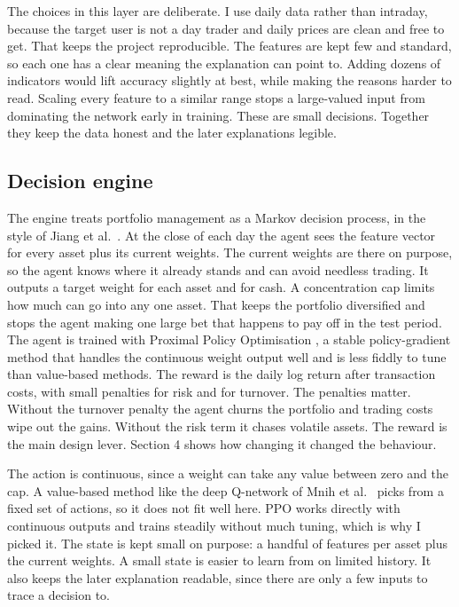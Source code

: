 \documentclass[12pt,twoside,letterpaper]{article}
\begin{document}
The choices in this layer are deliberate. I use daily data rather than intraday,
because the target user is not a day trader and daily prices are clean and free to
get. That keeps the project reproducible. The features are kept few and standard, so
each one has a clear meaning the explanation can point to. Adding dozens of
indicators would lift accuracy slightly at best, while making the reasons harder to
read. Scaling every feature to a similar range stops a large-valued input from
dominating the network early in training. These are small decisions. Together they
keep the data honest and the later explanations legible.

\subsection{Decision engine}

The engine treats portfolio management as a Markov decision process, in the style of
Jiang et al.\ \cite{jiang2017}. At the close of each day the agent sees the feature
vector for every asset plus its current weights. The current weights are there on
purpose, so the agent knows where it already stands and can avoid needless trading.
It outputs a target weight for each asset and for cash. A concentration cap limits
how much can go into any one asset. That keeps the portfolio diversified and stops
the agent making one large bet that happens to pay off in the test period. The agent
is trained with Proximal Policy Optimisation \cite{schulman2017}, a stable
policy-gradient method that handles the continuous weight output well and is less
fiddly to tune than value-based methods. The reward is the daily log return after
transaction costs, with small penalties for risk and for turnover. The penalties
matter. Without the turnover penalty the agent churns the portfolio and trading
costs wipe out the gains. Without the risk term it chases volatile assets. The
reward is the main design lever. Section 4 shows how changing it changed the
behaviour.

The action is continuous, since a weight can take any value between zero and the
cap. A value-based method like the deep Q-network of Mnih et al.\ \cite{mnih2015}
picks from a fixed set of actions, so it does not fit well here. PPO works directly
with continuous outputs and trains steadily without much tuning, which is why I
picked it. The state is kept small on purpose: a handful of features per asset plus
the current weights. A small state is easier to learn from on limited history. It
also keeps the later explanation readable, since there are only a few inputs to
trace a decision to.
\end{document}
